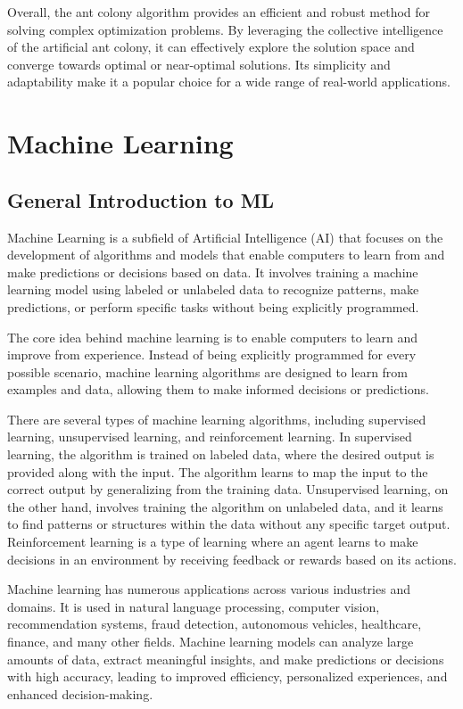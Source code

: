 Overall, the ant colony algorithm provides an efficient and robust method for solving complex optimization problems. By leveraging the collective intelligence of the artificial ant colony, it can effectively explore the solution space and converge towards optimal or near-optimal solutions. Its simplicity and adaptability make it a popular choice for a wide range of real-world applications.

\section{Machine Learning}%
\subsection{General Introduction to ML}
Machine Learning is a subfield of Artificial Intelligence (AI) that focuses on the development of algorithms and models that enable computers to learn from and make predictions or decisions based on data. It involves training a machine learning model using labeled or unlabeled data to recognize patterns, make predictions, or perform specific tasks without being explicitly programmed.

The core idea behind machine learning is to enable computers to learn and improve from experience. Instead of being explicitly programmed for every possible scenario, machine learning algorithms are designed to learn from examples and data, allowing them to make informed decisions or predictions.

There are several types of machine learning algorithms, including supervised learning, unsupervised learning, and reinforcement learning. In supervised learning, the algorithm is trained on labeled data, where the desired output is provided along with the input. The algorithm learns to map the input to the correct output by generalizing from the training data. Unsupervised learning, on the other hand, involves training the algorithm on unlabeled data, and it learns to find patterns or structures within the data without any specific target output. Reinforcement learning is a type of learning where an agent learns to make decisions in an environment by receiving feedback or rewards based on its actions.

Machine learning has numerous applications across various industries and domains. It is used in natural language processing, computer vision, recommendation systems, fraud detection, autonomous vehicles, healthcare, finance, and many other fields. Machine learning models can analyze large amounts of data, extract meaningful insights, and make predictions or decisions with high accuracy, leading to improved efficiency, personalized experiences, and enhanced decision-making.

